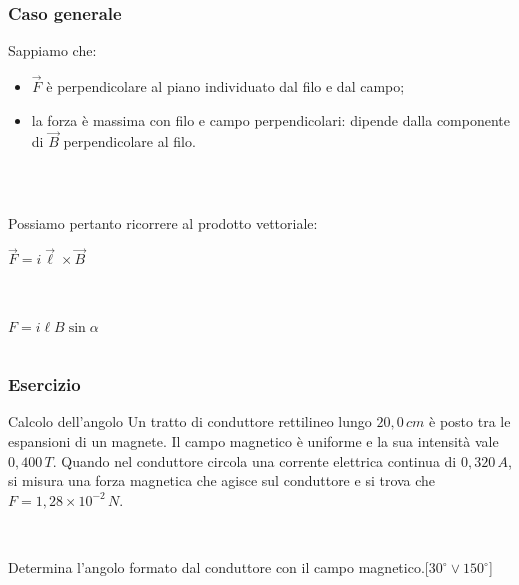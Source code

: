 \documentclass[]{beamer}
\theoremstyle{plain}
\begin{document}
\begin{frame}
\frametitle{Caso generale}
Sappiamo che:
\begin{itemize}
  \item $ \vec{F} $ è \alert<1>{perpendicolare al piano individuato dal filo e dal campo};\pause
  \item la forza è massima con filo e campo perpendicolari: \alert<2>{dipende dalla componente di $ \vec{B} $ perpendicolare al filo}.
\end{itemize}\pause

~

\begin{columns}
\begin{column}{0.5\textwidth}
Possiamo pertanto ricorrere al \alert<3>{prodotto vettoriale}:
\begin{center}
\colorbox{blue!30}{$ \vec{F}=i \vec{\ell}\times \vec{B} $}

~

$ F = i\ell B\sin\alpha $
\end{center}
\end{column}
\begin{column}{0.4\textwidth}
\end{column}
\end{columns}
\end{frame}


\begin{frame}
\frametitle{Esercizio}
\begin{exampleblock}{Calcolo dell'angolo}
  Un tratto di conduttore rettilineo lungo $ 20,0 \, cm $ è posto tra le espansioni di un magnete. Il campo magnetico è uniforme e la sua intensità vale $ 0,400 \, T $. Quando nel conduttore circola una corrente elettrica continua di $ 0,320 \, A $, si misura una forza magnetica che agisce sul conduttore e si trova che $ F = 1,28 \times 10^{-2} \, N $.

  ~

  Determina l'angolo formato dal conduttore con il campo magnetico.\hspace{\fill}[$ 30^\circ \vee 150^\circ $]
\end{exampleblock} 
\end{frame}
\end{document}
